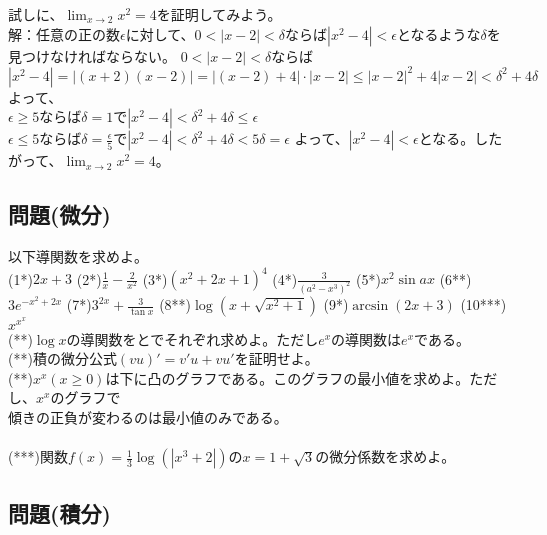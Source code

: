 \documentclass[a4j,dvipdfmx]{jsarticle}
\begin{document}
試しに、$\lim_{x\to 2}x^2=4$を証明してみよう。\\
解：任意の正の数$\epsilon$に対して、$0<|x-2|<\delta$ならば$|x^2-4|<\epsilon$となるような$\delta$を見つけなければならない。
$0<|x-2|<\delta$ならば
\begin{equation*}
    |x^2-4|=|(x+2)(x-2)|=|(x-2)+4|\cdot|x-2|\leq |x-2|^2+4|x-2|<\delta^2+4\delta
\end{equation*}
よって、\\
$\epsilon\geq5$ならば$\delta=1$で$|x^2-4|<\delta^2+4\delta\leq\epsilon$\\
$\epsilon\leq5$ならば$\delta=\frac{\epsilon}{5}$で$|x^2-4|<\delta^2+4\delta<5\delta=\epsilon$
よって、$|x^2-4|<\epsilon$となる。したがって、$\lim_{x\to 2}x^2=4$。
\newpage
\subsection*{問題(微分)}
以下導関数を求めよ。\\
(1*)$2x+3$
\hspace{10mm}
(2*)$\frac{1}{x}-\frac{2}{x^2}$
\hspace{10mm}
(3*)$(x^2+2x+1)^4$
\hspace{10mm}
(4*)$\frac{3}{(a^2-x^3)^2}$
\hspace{10mm}
(5*)$x^2\sin ax$
\hspace{10mm}
(6**)$3e^{-x^2+2x}$
\hspace{7mm}
(7*)$3^{2x}+\frac{3}{\tan x}$
\hspace{7mm}
(8**)$\log(x+\sqrt{x^2+1})$
\hspace{8mm}
(9*)$\arcsin(2x+3)$
\hspace{2mm}
(10***) ${x^{x^x}}$\\

(**)$\log x$の導関数をとでそれぞれ求めよ。ただし$e^x$の導関数は$e^x$である。\\


(**)積の微分公式$(vu)'=v'u+vu'$を証明せよ。\\

(**)$x^x(x\geq0)$は下に凸のグラフである。このグラフの最小値を求めよ。ただし、$x^x$のグラフで\\
\hspace{9mm}傾きの正負が変わるのは最小値のみである。\\\\
(***)関数$f(x)=\frac{1}{3}\log(|x^3+2|)$の$x=1+\sqrt{3}$の微分係数を求めよ。
\newpage
\subsection*{問題(積分)}
\end{document}
